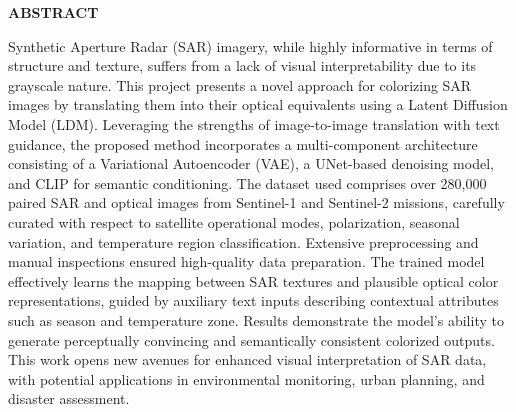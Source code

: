 \begin{center}
    {\large {\bf ABSTRACT}}
\end{center}

Synthetic Aperture Radar (SAR) imagery, while highly informative in terms of structure and texture, suffers from a lack of visual interpretability due to its grayscale nature. This project presents a novel approach for colorizing SAR images by translating them into their optical equivalents using a Latent Diffusion Model (LDM). Leveraging the strengths of image-to-image translation with text guidance, the proposed method incorporates a multi-component architecture consisting of a Variational Autoencoder (VAE), a UNet-based denoising model, and CLIP for semantic conditioning. The dataset used comprises over 280,000 paired SAR and optical images from Sentinel-1 and Sentinel-2 missions, carefully curated with respect to satellite operational modes, polarization, seasonal variation, and temperature region classification. Extensive preprocessing and manual inspections ensured high-quality data preparation. The trained model effectively learns the mapping between SAR textures and plausible optical color representations, guided by auxiliary text inputs describing contextual attributes such as season and temperature zone. Results demonstrate the model’s ability to generate perceptually convincing and semantically consistent colorized outputs. This work opens new avenues for enhanced visual interpretation of SAR data, with potential applications in environmental monitoring, urban planning, and disaster assessment.
